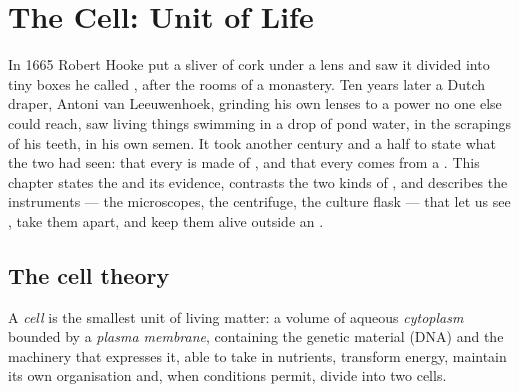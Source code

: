 \chapter{The Cell: Unit of Life}\label{ch:b1:cell-unit-of-life}

In 1665 Robert Hooke put a sliver of cork under a lens and saw it
divided into tiny boxes he called , after the rooms of a monastery.
Ten years later a Dutch draper, Antoni van Leeuwenhoek, grinding his
own lenses to a power no one else could reach, saw living things
swimming in a drop of pond water, in the scrapings of his teeth, in his
own semen. It took another century and a half to state what the two
had seen: that every  is made of , and that every 
comes from a . This chapter states the  and its
evidence, contrasts the two kinds of , and describes the
instruments --- the microscopes, the centrifuge, the culture flask ---
that let us see , take them apart, and keep them alive outside an
.

\section{The cell theory}

\begin{definition}[Cell]\label{def:b1:cell-unit-of-life:cell}
A \emph{cell} is the smallest unit of living matter: a
volume of aqueous \emph{cytoplasm} bounded by a
\emph{plasma membrane}, containing the genetic
material (DNA) and the machinery that expresses it, able to take in
nutrients, transform energy, maintain its own organisation and, when
conditions permit, divide into two cells.
\end{definition}

